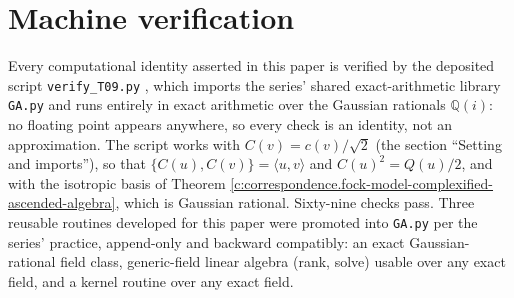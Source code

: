 \documentclass[11pt]{article}
\theoremstyle{definition}
\theoremstyle{plain}
\providecommand{\ip}{}\renewcommand{\ip}[2]{\langle #1, #2\rangle}
\begin{document}
\section{Machine verification}

\label{c:note.correspondence.setting-machine-verification}
Every computational identity asserted in this paper is verified by the deposited script \texttt{verify\_T09.py} \cite{ButlerVerifyT9}, which imports the series' shared exact-arithmetic library \texttt{GA.py} and runs entirely in exact arithmetic over the Gaussian rationals $\mathbb{Q}(i)$: no floating point appears anywhere, so every check is an identity, not an approximation. The script works with $C(v) = c(v)/\sqrt2$ (the section ``Setting and imports''), so that $\{C(u), C(v)\} = \ip{u}{v}$ and $C(u)^2 = Q(u)/2$, and with the isotropic basis of Theorem \ref{c:correspondence.fock-model-complexified-ascended-algebra}, which is Gaussian rational. Sixty-nine checks pass. Three reusable routines developed for this paper were promoted into \texttt{GA.py} per the series' practice, append-only and backward compatibly: an exact Gaussian-rational field class, generic-field linear algebra (rank, solve) usable over any exact field, and a kernel routine over any exact field.
\end{document}
